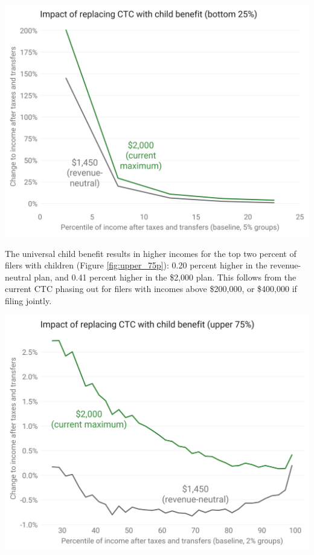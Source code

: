\documentclass[12pt]{article}
\begin{document}
\begin{center}
\includegraphics[width=15cm]{bottom_quartile.png}
\label{fig:bottom_quartile}
\end{center}

The universal child benefit results in higher incomes for the top two percent of filers with children (Figure \ref{fig:upper_75p}): 0.20 percent higher in the revenue-neutral plan, and 0.41 percent higher in the \$2,000 plan. This follows from the current CTC phasing out for filers with incomes above \$200,000, or \$400,000 if filing jointly.

\begin{center}
\includegraphics[width=15cm]{upper_75p.png}
\label{fig:upper_75p}
\end{center}
\end{document}
